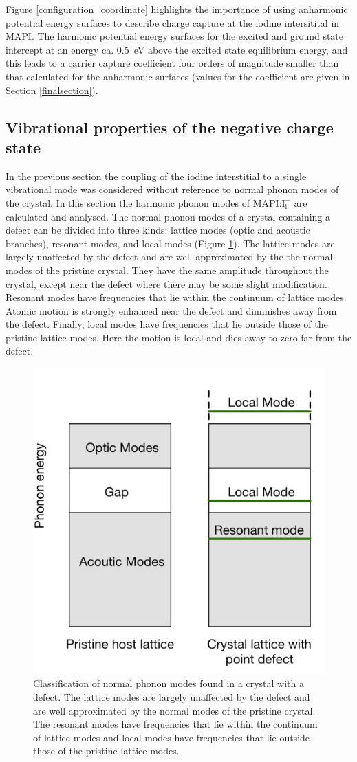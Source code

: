 Figure \ref{configuration_coordinate} highlights the importance of using anharmonic potential energy surfaces to describe charge capture at the iodine intersitital in MAPI. The harmonic potential energy surfaces for the excited and ground state intercept at an energy ca. \SI{0.5}{eV} above the excited state equilibrium energy, and this leads to a carrier capture coefficient four orders of magnitude smaller than that calculated for the anharmonic surfaces (values for the coefficient are given in Section \ref{finalsection}).

\subsection{Vibrational properties of the negative charge state}

In the previous section the coupling of the iodine interstitial to a single vibrational mode was considered without reference to normal phonon modes of the crystal.
In this section the harmonic phonon modes of MAPI:$\mathrm{I}_\mathrm{i}^-$ are calculated and analysed.
The normal phonon modes of a crystal containing a defect can be divided into three kinds: lattice modes (optic and acoustic branches), resonant modes, and local modes (Figure \ref{defect_modes_schematic}).\autocite{Hayes1985}
The lattice modes are largely unaffected by the defect and are well approximated by the the normal modes of the pristine crystal. They have the same amplitude throughout the crystal, except near the defect where there may be some slight modification. 
Resonant modes have frequencies that lie within the continuum of lattice modes. Atomic motion is strongly enhanced near the defect and diminishes away from the defect.
Finally, local modes have frequencies that lie outside those of the pristine lattice modes. Here the motion is local and dies away to zero far from the defect.

\begin{figure}[h!]   
\centering
  \includegraphics[width=0.4\columnwidth]{figures/ch6/defect_modes_schematic.png}
  \caption[Classification of normal phonon modes found in a crystal with a defect]{Classification of normal phonon modes found in a crystal with a defect. The lattice modes are largely unaffected by the defect and are well approximated by the normal modes of the pristine crystal. The resonant modes have frequencies that lie within the continuum of lattice modes and local modes have frequencies that lie outside those of the pristine lattice modes.}
\label{defect_modes_schematic}
\end{figure}  %

